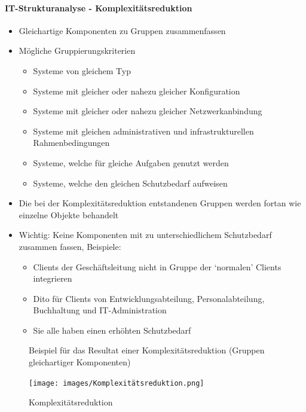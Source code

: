 \documentclass[10pt,a4paper]{article}
\begin{document}
\paragraph*{IT-Strukturanalyse - Komplexitätsreduktion}
\begin{itemize}[noitemsep,topsep=0pt,leftmargin=*]
    \item Gleichartige Komponenten zu Gruppen zusammenfassen
    \item Mögliche Gruppierungskriterien
    \begin{itemize}[noitemsep,topsep=0pt,leftmargin=*]
        \item Systeme von gleichem Typ
        \item Systeme mit gleicher oder nahezu gleicher Konfiguration
        \item Systeme mit gleicher oder nahezu gleicher Netzwerkanbindung
        \item Systeme mit gleichen administrativen und infrastrukturellen Rahmenbedingungen
        \item Systeme, welche für gleiche Aufgaben genutzt werden
        \item Systeme, welche den gleichen Schutzbedarf aufweisen
    \end{itemize}
    \item Die bei der Komplexitätsreduktion entstandenen Gruppen werden fortan wie einzelne Objekte behandelt
    \item Wichtig: Keine Komponenten mit zu unterschiedlichem Schutzbedarf zusammen fassen, Beispiele:
    \begin{itemize}[noitemsep,topsep=0pt,leftmargin=*]
        \item Clients der Geschäftsleitung nicht in Gruppe der `normalen' Clients integrieren
        \item Dito für Clients von Entwicklungsabteilung, Personalabteilung, Buchhaltung und IT-Administration
        \item Sie alle haben einen erhöhten Schutzbedarf
    \end{itemize}
\end{itemize}

\begin{figure}[H]
Beispiel für das Resultat einer Komplexitätsreduktion (Gruppen gleichartiger Komponenten)
    \begin{center}
    \texttt{[image: images/Komplexitätsreduktion.png]}
    \caption{Komplexitätsreduktion}
    \label{Komplexitätsreduktion}
    \end{center}
\end{figure}
\end{document}
